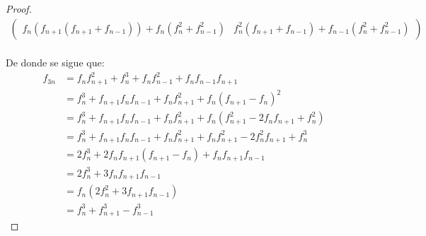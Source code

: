 \documentclass[11pt,letterpaper]{article}
\begin{document}
\begin{proof}
\begin{align*}
\begin{pmatrix}
            f_n(f_{n+1}(f_{n+1}+f_{n-1}))+f_{n}(f_n^2+f_{n-1}^2)&f_n^2(f_{n+1}+f_{n-1})+f_{n-1}(f_n^2+f_{n-1}^2)
        \end{pmatrix} 
    \end{align*}\,\\
    De donde se sigue que:\,\\
    \begin{align*}
        f_{3n}&=f_nf^2_{n+1}+f_n^3+f_n f_{n-1}^2+f_nf_{n-1}f_{n+1}\\
        &=f_n^3+f_{n+1}f_{n}f_{n-1}+f_nf_{n+1}^2+f_n(f_{n+1}-f_n)^2\\
        &=f_n^3+f_{n+1}f_{n}f_{n-1}+f_nf_{n+1}^2+f_n(f_{n+1}^2-2f_nf_{n+1}+f_n^2)\\
        &=f_n^3+f_{n+1}f_{n}f_{n-1}+f_nf_{n+1}^2+f_n f_{n+1}^2-2f_n^2f_{n+1}+f_n^3\\
        &=2f_n^3+2f_{n}f_{n+1}(f_{n+1}-f_{n})+f_{n}f_{n+1}f_{n-1}\\
        &=2f_n^3+3f_{n}f_{n+1}f_{n-1}\\
        &=f_n(2f_n^2+3f_{n+1}f_{n-1})\\
        &=f_n^3+f_{n+1}^3-f_{n-1}^3
    \end{align*}
\end{proof}
\end{document}
